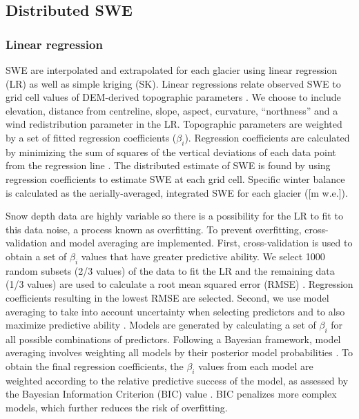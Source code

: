 \documentclass[review,oneside, letterpaper]{igs}
\begin{document}
\subsection{Distributed SWE}

\subsubsection{Linear regression}

SWE are interpolated and extrapolated for each glacier using linear regression (LR) as well as simple kriging (SK). Linear regressions relate observed SWE to grid cell values of DEM-derived topographic parameters \citep{Davis1986}. We choose to include elevation, distance from centreline, slope, aspect, curvature, ``northness'' and a wind redistribution parameter in the LR. Topographic parameters are weighted by a set of fitted regression coefficients ($\beta_i$). Regression coefficients are calculated by minimizing the sum of squares of the vertical deviations of each data point from the regression line \citep{Davis1986}. The distributed estimate of SWE is found by using regression coefficients to estimate SWE at each grid cell. Specific winter balance is calculated as the aerially-averaged, integrated SWE for each glacier ([m w.e.]). 

Snow depth data are highly variable so there is a possibility for the LR to fit to this data noise, a process known as overfitting. To prevent overfitting, cross-validation and model averaging are implemented. First, cross-validation is used to obtain a set of $\beta_i$ values that have greater predictive ability. We select 1000 random subsets (2/3 values) of the data to fit the LR and the remaining data (1/3 values) are used to calculate a root mean squared error (RMSE) \citep{Kohavi1995}. Regression coefficients resulting in the lowest RMSE are selected. Second, we use model averaging to take into account uncertainty when selecting predictors and to also maximize predictive ability \citep{Madigan1994}. Models are generated by calculating a set of $\beta_i$ for all possible combinations of predictors. Following a Bayesian framework, model averaging involves weighting all models by their posterior model probabilities \citep{Raftery1997}. To obtain the final regression coefficients, the $\beta_i$ values from each model are weighted according to the relative predictive success of the model, as assessed by the Bayesian Information Criterion (BIC) value \citep{Burnham2004}. BIC penalizes more complex models, which further reduces the risk of overfitting.
\end{document}
